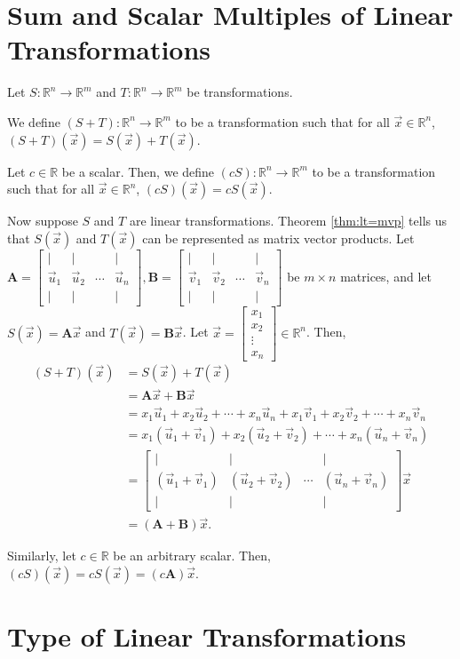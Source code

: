 \documentclass[]{book}
\newcommand{\vecxxdx}[1][x]{\ensuremath{\begin{bmatrix}
#1_1 \\
#1_2 \\
\vdots \\
#1_n
\end{bmatrix}}}
\newcommand{\mat}[1]{\ensuremath{\mathbf{#1}}}
\newcommand{\cmat}[1][v]{\begin{bmatrix}
        \vert & \vert & & \vert \\
        \vec{#1}_1 & \vec{#1}_2 & \cdots & \vec{#1}_n \\
        \vert & \vert & & \vert
    \end{bmatrix}
}
\newcommand{\R}{\ensuremath{\mathbb{R}}}
\begin{document}
\section{Sum and Scalar Multiples of Linear Transformations}
Let $S:\R^n \to \R^m$ and $T:\R^n \to \R^m$ be transformations.
\begin{definition}
    We define $(S+T):\R^n \to \R^m$ to be a transformation such that for all $\vec{x} \in \R^n$, $(S+T)(\vec{x}) = S(\vec{x}) + T(\vec{x})$.
\end{definition}
\begin{definition}
    Let $c \in \R$ be a scalar. Then, we define $(cS):\R^n \to \R^m$ to be a transformation such that for all $\vec{x} \in \R^n$, $(cS)(\vec{x}) = cS(\vec{x})$.
\end{definition}

Now suppose $S$ and $T$ are linear transformations. Theorem \ref{thm:lt=mvp} tells us that $S(\vec{x})$ and $T(\vec{x})$ can be represented as matrix vector products. Let $\mat{A}=\cmat[u],\mat{B}=\cmat[v]$ be $m \times n$ matrices, and let $S(\vec{x})=\mat{A}\vec{x}$ and $T(\vec{x}) = \mat{B}\vec{x}$. Let $\vec{x}=\vecxxdx \in \R^n$. Then,
\begin{align*}
    (S+T)(\vec{x}) &= S(\vec{x})+T(\vec{x}) \\
    &= \mat{A}\vec{x} + \mat{B}\vec{x} \\
    &= x_1\vec{u}_1 + x_2\vec{u}_2 + \cdots + x_n\vec{u}_n + x_1\vec{v}_1 + x_2\vec{v}_2 + \cdots + x_n\vec{v}_n \\
    &= x_1(\vec{u}_1 + \vec{v}_1) + x_2(\vec{u}_2 + \vec{v}_2) + \cdots + x_n(\vec{u}_n + \vec{v}_n) \\
    &= \begin{bmatrix}\vert&\vert&&\vert \\ (\vec{u}_1 + \vec{v}_1) & (\vec{u}_2 + \vec{v}_2) & \cdots & (\vec{u}_n + \vec{v}_n) \\ \vert & \vert && \vert\end{bmatrix} \vec{x} \\
    &= (\mat{A} + \mat{B})\vec{x}.
\end{align*}

Similarly, let $c \in \R$ be an arbitrary scalar. Then, $(cS)(\vec{x}) = cS(\vec{x}) = (c\mat{A})\vec{x}$.

\section{Type of Linear Transformations}
\end{document}
